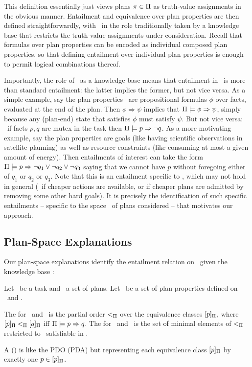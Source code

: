 This definition essentially just views plans $\pi \in \Pi$ as
truth-value assignments in the obvious manner. Entailment and
equivalence over plan properties are then defined straightforwardly,
with \plans\ in the role traditionally taken by a knowledge base that
restricts the truth-value assignments under consideration. Recall that
formulas over plan properties can be encoded as individual composed
plan properties, so that defining entailment over individual plan
properties is enough to permit logical combinations thereof.

Importantly, the role of \plans\ as a knowledge base means that
entailment in \plans\ is more than standard entailment: the latter
implies the former, but not vice versa. As a simple example, say the
plan properties \props\ are propositional formulas $\phi$ over facts,
evaluated at the end of the plan. Then $\phi \Rightarrow \psi$ implies
that $\Pi \models \phi \Rightarrow \psi$, simply because any (plan-end)
state that satisfies $\phi$ must satisfy $\psi$. But not vice versa:
\eg\ if facts $p, q$ are mutex in the task then
$\Pi \models p \Rightarrow \neg q$. As a more motivating example, say the
plan properties are goals (like having scientific observations in
satellite planning) as well as resource constraints (like consuming at
most a given amount of energy). Then entailments of interest can take
the form $\Pi \models p \Rightarrow \neg q_1 \vee \neg q_2 \vee \neg q_3$
saying that we cannot have $p$ without foregoing either of $q_1$ or
$q_2$ or $q_3$. Note that this is an entailment specific to \plans,
which may not hold in general (\eg\ if cheaper actions are available,
or if cheaper plans are admitted by removing some other hard
goals). It is precisely the identification of such specific
entailments -- specific to the space \plans\ of plans considered --
that motivates our approach.





\subsection{Plan-Space Explanations}

Our plan-space explanations identify the entailment relation on
\props\ given the knowledge base \plans:

\begin{definition}
Let \task\ be a task and \plans\ a set of plans. Let \props\ be a set
of plan properties defined on \task\ and \plans.

The  for \plans\ and
\props\ is the partial order $<_{\Pi}$ over the equivalence
classes $[p]_{\Pi}$, where $[p]_{\Pi}
<_{\Pi} [q]_{\Pi}$ iff
$\Pi \models p \Rightarrow q$.
%
The  for
\plans\ and \props\ is the set of minimal elements of $<_{\Pi}$
restricted to \prop\ satisfiable in \plans.

A  () is
like the PDO (PDA) but representing each equivalence class
$[p]_{\Pi}$ by exactly one $p \in
[p]_{\Pi}$.
\end{definition}

